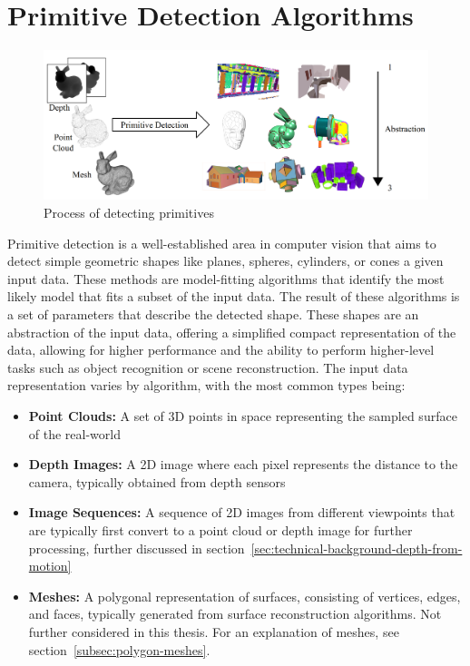 \chapter{Primitive Detection Algorithms}

\begin{figure}[ht!]
    \centering
    \includegraphics[width=\linewidth]{images/primitive_detection}
    \caption{Process of detecting primitives}
    \label{fig:primitive_detection}
\end{figure}
Primitive detection is a well-established area in computer vision that aims to detect simple geometric shapes
like planes, spheres, cylinders, or cones a given input data.
These methods are model-fitting algorithms that identify the most likely model that fits a subset of the input data.
The result of these algorithms is a set of parameters that describe the detected shape.
These shapes are an abstraction of the input data, offering a simplified compact representation of the data,
allowing for higher performance and the ability to perform higher-level tasks such as object recognition or scene reconstruction.
The input data representation varies by algorithm, with the most common types being:
\begin{itemize}
    \item \textbf{Point Clouds:} A set of 3D points in space representing the sampled surface of the real-world
    \item \textbf{Depth Images:} A 2D image where each pixel represents the distance to the camera, typically obtained from depth sensors
    \item \textbf{Image Sequences:} A sequence of 2D images from different viewpoints that are typically first convert to a point cloud or depth image for further processing, further discussed in section~\ref{sec:technical-background-depth-from-motion}
    \item \textbf{Meshes:} A polygonal representation of surfaces, consisting of vertices, edges, and faces, typically generated from surface reconstruction algorithms.
    Not further considered in this thesis.
    For an explanation of meshes, see section~\ref{subsec:polygon-meshes}.~\cite{kaiser_survey_2019}
\end{itemize}

